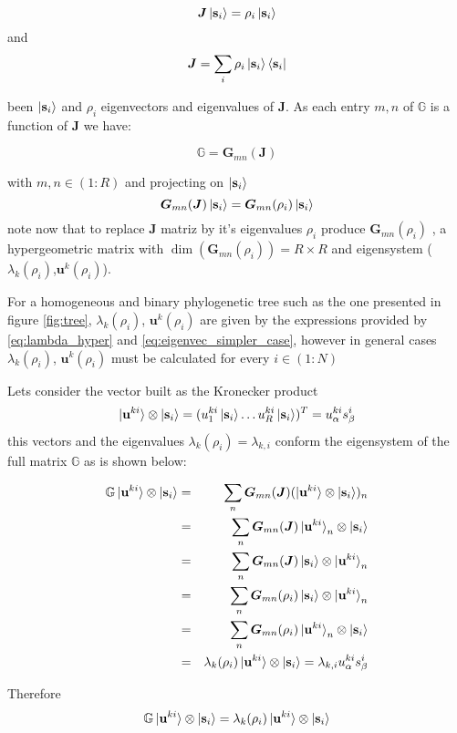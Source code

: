 \documentclass[reprint,amsmath,amssymb,superscriptaddress,showpacs,pre]{revtex4-1}
\begin{document}
$$\bm  J \ket{\textbf{s}_i} =\rho_i\ket{\textbf{s}_i }$$
and
$$\bm J=\sum_{i}\rho_i \ket{\textbf{s}_i}  \bra{\textbf{s}_i}  $$

been $\ket{\textbf{s}_i}$ and $\rho_i$ eigenvectors and eigenvalues of $\bm J$. As each entry $m,n$ of $\mathbb{G}$ is a function of $\bm J$ we have:

$$\mathbb{G}=\bm G_{m n}(\bm J)$$

with $m,n \in (1:R)$ and projecting on $\ket{\textbf{s}_i}$   $$\bm G_{m n}(\bm J)\ket{\textbf{s}_i} =\bm G_{m n}(\rho_i)\ket{\textbf{s}_i} $$  note now that to replace $\bm J$ matriz by it's eigenvalues $\rho_i$   produce $\bm G_{m n}(\rho_i)$ , a hypergeometric matrix  with $\dim(\bm G_{m n}(\rho_i))=R\times R $ and eigensystem ($\lambda_k(\rho_i)$,$\textbf{u}^k(\rho_i)$).  

For a homogeneous and binary phylogenetic tree such as the one presented in figure \ref{fig:tree}, $\lambda_k (\rho_i)$, $\textbf{u}^k(\rho_i) $ are given by the expressions provided by \ref{eq:lambda_hyper} and \ref{eq:eigenvec_simpler_case}, however in general cases $ \lambda_k (\rho_i) $, $\textbf{u}^k(\rho_i)$ must be calculated for every $ i \in (1: N) $

Lets consider the vector built as the Kronecker product  $$\ket{\textbf{u}^{ki}} \otimes\ket{\textbf{s}_i} =(u^{ki}_1 \ket{\textbf{s}_i} \dotsc u^{ki}_R \ket{\textbf{s}_i} )^T=u^{ki}_{\alpha}s^{i}_{\beta}$$
this vectors and the eigenvalues $\lambda_{k}(\rho_i)=\lambda_{k,i}$ conform the eigensystem of the full matrix  $\mathbb{G}$ as is shown below:

\begin{eqnarray*}\mathbb{G}\ket{\textbf{u}^{ki}} \otimes\ket{\textbf{s}_i} &=&\sum_{n}\bm G_{mn}(\bm J)(\ket{\textbf{u}^{ki}} \otimes\ket{\textbf{s}_i})_n\\ &=&\sum_{n}\bm G_{mn}(\bm J)\ket{\textbf{u}^{ki}}_n\otimes\ket{\textbf{s}_i}\\&=&\sum_{n}\bm G_{mn}(\bm J)\ket{\textbf{s}_i}\otimes \ket{\textbf{u}^{ki}}_n\\&=&\sum_{n}\bm G_{mn}(\rho_i)\ket{ \textbf{s}_i} \otimes \ket{\textbf{u}^{ki}}_n\\&=&\sum_{n}\bm G_{mn}(\rho_i)\ket{\textbf{u}^{ki}}_n\otimes\ket{\textbf{s}_i}\\&=&\lambda_k(\rho_i) \ket{\textbf{u}^{ki}}\otimes\ket{\textbf{s}_i}=\lambda_{k,i} u^{ki}_{\alpha}s^{i}_{\beta} 
\end{eqnarray*}


Therefore $$\mathbb{G}\ket{\textbf{u}^{ki}} \otimes\ket{\textbf{s}_i}=\lambda_k(\rho_i) \ket{\textbf{u}^{ki}} \otimes\ket{\textbf{s}_i} $$ 
\end{document}
